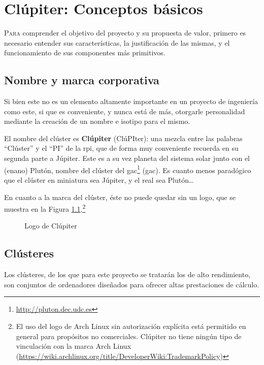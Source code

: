 \chapter{Clúpiter: Conceptos básicos}
\label{chap:conceptos_basicos}

\lettrine{P}{ara} comprender el objetivo del proyecto y su propuesta de valor, primero es necesario entender sus características, la justificación de las mismas, y el funcionamiento de sus componentes más primitivos.

\section{Nombre y marca corporativa}
Si bien este no es un elemento altamente importante en un proyecto de ingeniería como este, si que es conveniente, y nunca está de más, otorgarle personalidad mediante la creación de un nombre e isotipo para el mismo.

El nombre del clúster es \textbf{Clúpiter} (ClúPIter): una mezcla entre las palabras ``Clúster'' y el ``PI'' de la \acrlong{rpi}, que de forma muy conveniente recuerda en su segunda parte a Júpiter. Este es a su vez planeta del sistema solar junto con el (enano) Plutón, nombre del clúster del \acrshort{gac}\footnote{\url{http://pluton.dec.udc.es}} (\acrlong{gac}). Es cuanto menos paradógico que el clúster en miniatura sea Júpiter, y el real sea Plutón\dots

En cuanto a la marca del clúster, éste no puede quedar sin un logo, que se muestra en la Figura \ref{fig:clupiter_logo}.\footnote{El uso del logo de Arch Linux sin autorización explícita está permitido en general para propósitos no comerciales. Clúpiter no tiene ningún tipo de vinculación con la marca Arch Linux (\url{https://wiki.archlinux.org/title/DeveloperWiki:TrademarkPolicy})}

\begin{figure}[h!]
  \centering
  \vspace*{0.5cm}
  \def\svgwidth{0.50\textwidth}
  
  \caption{Logo de Clúpiter}
  \label{fig:clupiter_logo}
\end{figure}

\section{Clústeres}
Los clústeres, de los que para este proyecto se tratarán los de alto rendimiento, son conjuntos de ordenadores diseñados para ofrecer altas prestaciones de cálculo.

